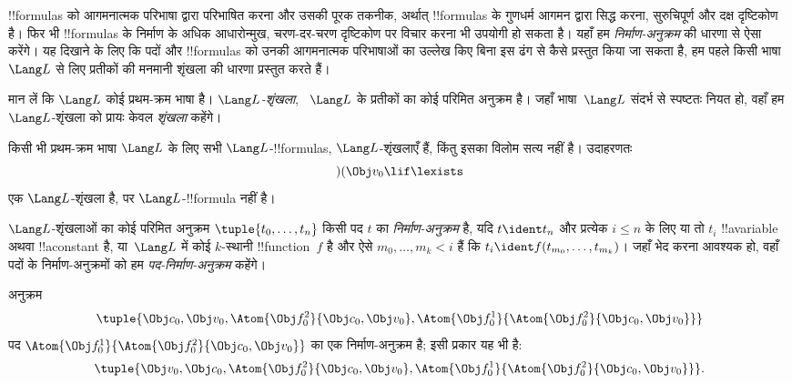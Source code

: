 \documentclass[../../../include/open-logic-section]{subfiles}
\begin{document}


!!{formula}s को आगमनात्मक परिभाषा द्वारा परिभाषित करना और उसकी पूरक तकनीक,
अर्थात् !!{formula}s के गुणधर्म आगमन द्वारा सिद्ध करना, सुरुचिपूर्ण और दक्ष
दृष्टिकोण है। फिर भी !!{formula}s के निर्माण के अधिक आधारोन्मुख, चरण-दर-चरण
दृष्टिकोण पर विचार करना भी उपयोगी हो सकता है। यहाँ हम \emph{निर्माण-अनुक्रम}
की धारणा से ऐसा करेंगे।
%
यह दिखाने के लिए कि पदों और !!{formula}s को उनकी आगमनात्मक परिभाषाओं का
उल्लेख किए बिना इस ढंग से कैसे प्रस्तुत किया जा सकता है, हम पहले किसी
भाषा~$\Lang L$ से लिए प्रतीकों की मनमानी शृंखला की धारणा प्रस्तुत करते हैं।

\begin{defn}[शृंखलाएँ]
मान लें कि $\Lang L$ कोई प्रथम-क्रम भाषा है। \emph{$\Lang
L$-शृंखला},
~$\Lang L$ के प्रतीकों का कोई परिमित अनुक्रम है। जहाँ भाषा~$\Lang L$ संदर्भ
से स्पष्टतः नियत हो, वहाँ हम $\Lang L$-शृंखला को प्रायः केवल \emph{शृंखला}
कहेंगे।
\end{defn}

\begin{ex}
किसी भी प्रथम-क्रम भाषा $\Lang L$ के लिए सभी $\Lang L$-!!{formula}s,
$\Lang L$-शृंखलाएँ हैं, किंतु इसका विलोम सत्य नहीं है। उदाहरणतः
\[)(\Obj v_0\lif\lexists\] एक $\Lang L$-शृंखला है, पर $\Lang L$-!!{formula}
नहीं है।
\end{ex}

\begin{defn}[पदों के निर्माण-अनुक्रम]
$\Lang L$-शृंखलाओं का कोई परिमित अनुक्रम $\tuple{t_0,\dotsc,t_n}$ किसी
पद $t$ का \emph{निर्माण-अनुक्रम} है, यदि $t \ident t_n$ और प्रत्येक $i \leq n$
के लिए या तो $t_i$ !!a{variable} अथवा !!a{constant} है, या~$\Lang
L$
में कोई $k$-स्थानी !!{function}~$f$ है और ऐसे $m_0,\dotsc,m_k < i$ हैं कि
$t_i \ident f(t_{m_0},\dotsc,t_{m_k})$। जहाँ भेद करना आवश्यक हो, वहाँ पदों
के निर्माण-अनुक्रमों को हम \emph{पद-निर्माण-अनुक्रम} कहेंगे।
\end{defn}

\begin{ex}
अनुक्रम
\[
    \tuple{\Obj c_0, \Obj v_0, \Atom{\Obj f^2_0}{\Obj c_0, \Obj v_0}, \Atom{\Obj f^1_0}{\Atom{\Obj f^2_0}{\Obj c_0, \Obj v_0}}}
\]
पद $\Atom{\Obj f^1_0}{\Atom{\Obj
f^2_0}{\Obj c_0, \Obj v_0}}$ का एक
निर्माण-अनुक्रम है; इसी प्रकार यह भी है:
\[
    \tuple{\Obj v_0, \Obj c_0, \Atom{\Obj f^2_0}{\Obj c_0, \Obj v_0}, \Atom{\Obj f^1_0}{\Atom{\Obj f^2_0}{\Obj c_0, \Obj v_0}}}.
\]
\end{ex}
\end{document}
